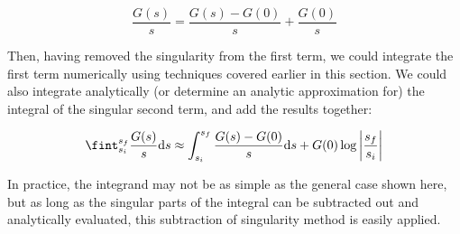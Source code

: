 \begin{equation}
    \frac{G(s)}{s} = \frac{G(s)-G(0)}{s} + \frac{G(0)}{s}
\end{equation}

\noindent Then, having removed the singularity from the first term, we could integrate the first term numerically using techniques covered earlier in this section.
%
We could also integrate analytically (or determine an analytic approximation for) the integral of the singular second term, and add the results together:

\begin{equation}
    \fint_{s_i}^{s_f} \frac{G(s)}{s} \d s \approx \int_{s_i}^{s_f} \frac{G(s) - G(0)}{s} \d s  + G(0) \log\left|\frac{s_f}{s_i}\right|
\end{equation}

In practice, the integrand may not be as simple as the general case shown here, but as long as the singular parts of the integral can be subtracted out and analytically evaluated, this subtraction of singularity method is easily applied.
